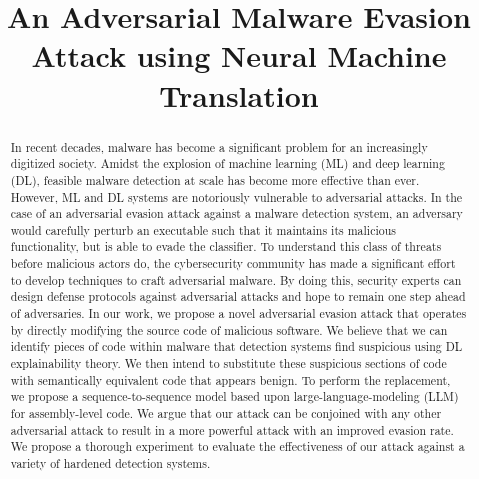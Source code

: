 \documentclass[conference]{IEEEtran}
\begin{document}
\title{An Adversarial Malware Evasion Attack using Neural Machine Translation}


\maketitle


\begin{abstract}
	In recent decades, malware has become a significant problem for an increasingly digitized society. Amidst the explosion of machine learning (ML) and deep learning (DL), feasible malware detection at scale has become more effective than ever. However, ML and DL systems are notoriously vulnerable to adversarial attacks. In the case of an adversarial evasion attack against a malware detection system, an adversary would carefully perturb an executable such that it maintains its malicious functionality, but is able to evade the classifier. To understand this class of threats before malicious actors do, the cybersecurity community has made a significant effort to develop techniques to craft adversarial malware. By doing this, security experts can design defense protocols against adversarial attacks and hope to remain one step ahead of adversaries. In our work, we propose a novel adversarial evasion attack that operates by directly modifying the source code of malicious software. We believe that we can identify pieces of code within malware that detection systems find suspicious using DL explainability theory. We then intend to substitute these suspicious sections of code with semantically equivalent code that appears benign. To perform the replacement, we propose a sequence-to-sequence model based upon large-language-modeling (LLM) for assembly-level code. We argue that our attack can be conjoined with any other adversarial attack to result in a more powerful attack with an improved evasion rate. We propose a thorough experiment to evaluate the effectiveness of our attack against a variety of hardened detection systems.
\end{abstract}
\end{document}
